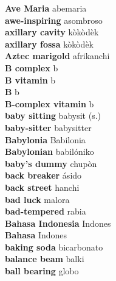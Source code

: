 \textbf{ Ave Maria  } abemaria \\
\textbf{ awe-inspiring  } asombroso \\
\textbf{ axillary cavity  } kòkòdèk \\
\textbf{ axillary fossa  } kòkòdèk \\
\textbf{ Aztec marigold  } afrikanchi \\
\textbf{ B complex  } b \\
\textbf{ B vitamin  } b \\
\textbf{ B  } b \\
\textbf{ B-complex vitamin  } b \\
\textbf{ baby sitting  } babysit (s.) \\
\textbf{ baby-sitter  } babysitter \\
\textbf{ Babylonia  } Babilonia \\
\textbf{ Babylonian  } babilóniko \\
\textbf{ baby’s dummy  } chupòn \\
\textbf{ back breaker  } ásido \\
\textbf{ back street  } hanchi \\
\textbf{ bad luck  } malora \\
\textbf{ bad-tempered  } rabia \\
\textbf{ Bahasa Indonesia  } Indones \\
\textbf{ Bahasa  } Indones \\
\textbf{ baking soda  } bicarbonato \\
\textbf{ balance beam  } balki \\
\textbf{ ball bearing  } globo \\
